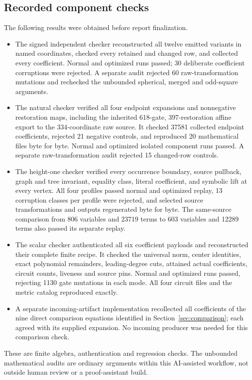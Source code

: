 \subsection{Recorded component checks}
The following results were obtained before report finalization.
\begin{itemize}
\item The signed independent checker reconstructed all twelve emitted
variants in named coordinates, checked every retained and changed row,
and collected every coefficient. Normal and optimized runs passed;
30 deliberate coefficient corruptions were rejected. A separate audit rejected 60 raw-transformation mutations and
rechecked the unbounded spherical, merged and odd-square arguments.
\item The natural checker verified all four endpoint expansions and
nonnegative restoration maps, including the inherited 618-gate,
397-restoration affine export to the 334-coordinate raw source.
It checked 37581 collected endpoint coefficients, rejected 21 negative
controls, and reproduced 20 mathematical files byte for byte. Normal and
optimized isolated component runs passed. A separate raw-transformation
audit rejected 15 changed-row controls.
\item The height-one checker verified every occurrence boundary, source
pullback, graph and tree invariant, equality class, literal coefficient,
and symbolic lift at every vertex. All four profiles passed normal and
optimized replay, 13 corruption classes per profile were rejected, and
selected source transformations and outputs regenerated byte for byte.
The same-source comparison from 806 variables and 23719 terms to
603 variables and 12289 terms also passed its separate replay.
\item The scalar checker authenticated all six coefficient payloads and
reconstructed their complete finite recipe. It checked the universal norm,
center identities, exact polynomial remainders, leading-degree cuts,
attained actual coefficients, circuit counts, liveness and source pins.
Normal and optimized runs passed, rejecting 1130 gate mutations in
each mode. All four circuit files and the metric catalog reproduced exactly.
\item A separate incoming-artifact implementation recollected all
coefficients of the nine direct comparison equations identified in
Section~\ref{sec:comparison}; each agreed with its supplied expansion.
No incoming producer was needed for this comparison check.
\end{itemize}
These are finite algebra, authentication and regression checks. The
unbounded mathematical audits are ordinary arguments within this
AI-assisted workflow, not outside human review or a proof-assistant build.

